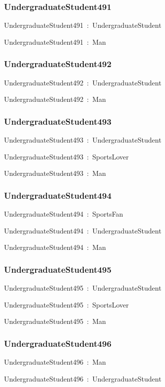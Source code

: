 \documentclass{article}
\begin{document}
\subsubsection*{UndergraduateStudent491}

UndergraduateStudent491~:~UndergraduateStudent

UndergraduateStudent491~:~Man

\subsubsection*{UndergraduateStudent492}

UndergraduateStudent492~:~UndergraduateStudent

UndergraduateStudent492~:~Man

\subsubsection*{UndergraduateStudent493}

UndergraduateStudent493~:~UndergraduateStudent

UndergraduateStudent493~:~SportsLover

UndergraduateStudent493~:~Man

\subsubsection*{UndergraduateStudent494}

UndergraduateStudent494~:~SportsFan

UndergraduateStudent494~:~UndergraduateStudent

UndergraduateStudent494~:~Man

\subsubsection*{UndergraduateStudent495}

UndergraduateStudent495~:~UndergraduateStudent

UndergraduateStudent495~:~SportsLover

UndergraduateStudent495~:~Man

\subsubsection*{UndergraduateStudent496}

UndergraduateStudent496~:~Man

UndergraduateStudent496~:~UndergraduateStudent
\end{document}
